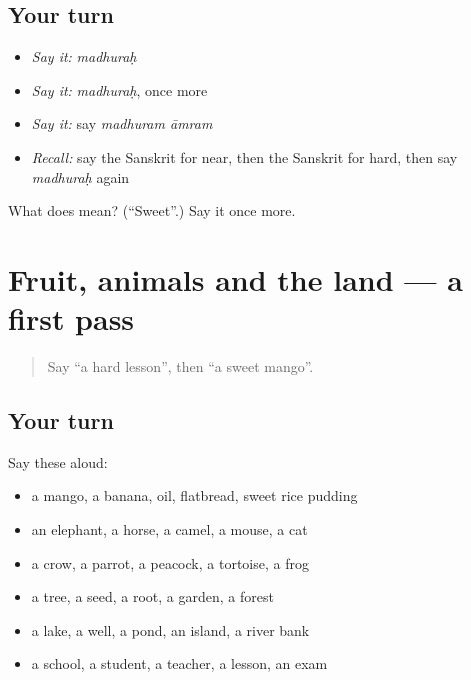 \subsection*{Your turn}
\begin{itemize}
\raggedright
  \item \emph{Say it:} \emph{madhuraḥ}
  \item \emph{Say it:} \emph{madhuraḥ}, once more
  \item \emph{Say it:} say \emph{madhuram āmram}
  \item \emph{Recall:} say the Sanskrit for near, then the Sanskrit for hard, then say \emph{madhuraḥ} again
\end{itemize}

\begin{tcolorbox}[breakable,colback=teal!4,colframe=teal!35!black,title={Before you move on}]
What does  mean? (\textquotedblleft{}Sweet\textquotedblright{}.) Say it once more.
\end{tcolorbox}
\section[(dialogue)]{Fruit, animals and the land — a first pass}

\label{lesson:SA-R89-first-pass-food-animals-nature}



\begin{quote}
Say \textquotedblleft{}a hard lesson\textquotedblright{}, then \textquotedblleft{}a sweet mango\textquotedblright{}.
\end{quote}

\subsection*{Your turn}
Say these aloud:

\begin{itemize}
\raggedright
  \item a mango, a banana, oil, flatbread, sweet rice pudding
  \item an elephant, a horse, a camel, a mouse, a cat
  \item a crow, a parrot, a peacock, a tortoise, a frog
  \item a tree, a seed, a root, a garden, a forest
  \item a lake, a well, a pond, an island, a river bank
  \item a school, a student, a teacher, a lesson, an exam
\end{itemize}

